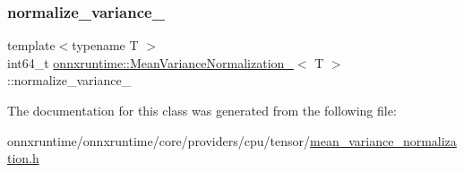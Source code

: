 \subsubsection{\texorpdfstring{normalize\+\_\+variance\+\_\+}{normalize\_variance\_}}
{\footnotesize\ttfamily template$<$typename T $>$ \\
int64\+\_\+t \mbox{\hyperlink{classonnxruntime_1_1MeanVarianceNormalization__0}{onnxruntime\+::\+Mean\+Variance\+Normalization\+\_}}$<$ T $>$\+::normalize\+\_\+variance\+\_\+\hspace{0.3cm}{\ttfamily [protected]}}



The documentation for this class was generated from the following file\+:\begin{DoxyCompactItemize}
\item 
onnxruntime/onnxruntime/core/providers/cpu/tensor/\mbox{\hyperlink{mean__variance__normalization_8h}{mean\+\_\+variance\+\_\+normalization.\+h}}\end{DoxyCompactItemize}
